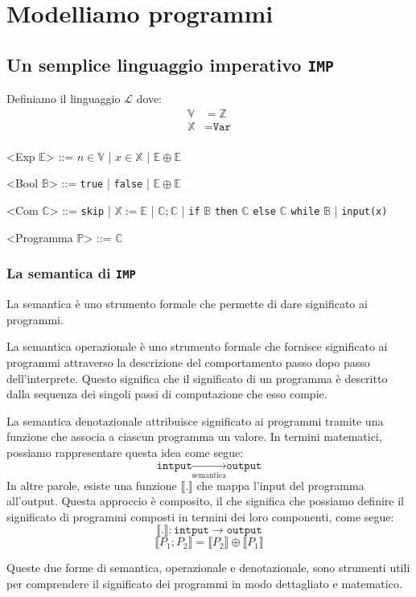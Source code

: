 \chapter{Modelliamo programmi}
\section{Un semplice linguaggio imperativo \texttt{IMP}}
Definiamo il linguaggio $\mathcal{L}$ dove:
\[
\begin{split}
    \mathbb{V} &= \mathbb{Z} \\
    \mathbb{X} &= \texttt{Var} \\
\end{split}
\]
\begin{grammar}
    <Exp $\mathbb{E}$> ::= $n\in \mathbb{V}$ | $x \in \mathbb{X}$ | 
    $\mathbb{E}  \oplus \mathbb{E}$

    <Bool $\mathbb{B}$> ::= \texttt{true} | \texttt{false} | $\mathbb{E} \oplus \mathbb{E}$

    <Com $\mathbb{C}$> ::= \texttt{skip} | $\mathbb{X} := \mathbb{E}$ | $\mathbb{C};\mathbb{C}$ |
    \texttt{if} $\mathbb{B}$ \texttt{then} $\mathbb{C}$ \texttt{else} $\mathbb{C}$
    \alt \texttt{while}  $\mathbb{B}$ | \texttt{input(x)} 

    <Programma $\mathbb{P}$> ::= $\mathbb{C}$
\end{grammar}
\subsection{La semantica di \texttt{IMP}}
La semantica è uno strumento formale che permette di dare significato ai programmi.


\begin{tcolorbox}[title = {Semantica operazionale}]
  La semantica operazionale è uno strumento formale che fornisce
  significato ai programmi attraverso la descrizione del comportamento
  passo dopo passo dell'interprete. Questo significa che il significato
  di un programma è descritto
  dalla sequenza dei singoli passi di computazione che esso compie.
\end{tcolorbox}

\begin{tcolorbox}[title = {Semantica denotazionale}]
  La semantica denotazionale attribuisce significato ai programmi
  tramite una funzione che associa a ciascun programma un valore.
  In termini matematici, possiamo rappresentare questa idea come segue:
    \[
      \texttt{intput}  \xrightarrow[\text{semantica}]{} \texttt{output} 
    \]
  In altre parole, esiste una funzione $\llbracket . \rrbracket$ che
  mappa l'input del programma all'output. Questa approccio è composito,
  il che significa che possiamo definire il significato di programmi
  composti in termini dei loro componenti, come segue:
    \[
      \llbracket . \rrbracket   : \texttt{intput}  \rightarrow \texttt{output}
    \]
    \[
      \llbracket P_1; P_2\rrbracket  = \llbracket P_2\rrbracket  \oplus \llbracket P_1\rrbracket
    \]
\end{tcolorbox}
Queste due forme di semantica, operazionale e denotazionale, sono
strumenti utili per comprendere
il significato dei programmi in modo dettagliato e matematico.
